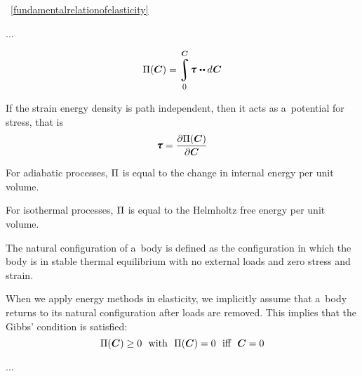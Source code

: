 

~\eqref{fundamentalrelationofelasticity}

...

{\small

\[ \potential(\bm{C}) = \displaystyle \integral_{\raisemath{-0.25em}{\hspace{-0.1ex}\scalebox{0.85}{$0$}}}^{\raisemath{.15em}{\bm{C}}} \hspace{-0.25ex} \cauchystress \hspace{.1ex} \dotdotp d \hspace{.1ex} \boldsymbol{\bm{C}} \]

If the strain energy density is path independent, then it acts as a~potential for stress, that is
\[ \displaystyle \cauchystress = {\frac{\partial \potential(\bm{C})}{\partial \bm{C}}} \]

For adiabatic processes, ${\Pi}$ is equal to the change in internal energy per unit volume.

For isothermal processes, ${\Pi}$ is equal to the Helmholtz free energy per unit volume.

The natural configuration of a~body is defined as the configuration in which the body is in stable thermal equilibrium with no external loads and zero stress and strain.

When we apply energy methods in elasticity, we implicitly assume that a~body returns to its natural configuration after loads are removed. This implies that the Gibbs’ condition is satisfied:
\[ \Pi(\bm{C}) \geq 0~~{\text{with}}~~\Pi(\bm{C}) = 0~~{\text{iff}}~~\bm{C} = 0 \]

\par}

...

